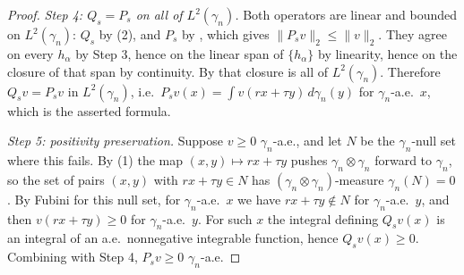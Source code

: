 \begin{proof}
\emph{Step 4: $Q_s = P_s$ on all of $L^2(\gamma_n)$.}
Both operators are linear and bounded on $L^2(\gamma_n)$: $Q_s$ by (2), and
$P_s$ by , which gives
$\|P_s v\|_2 \leq \|v\|_2$.  They agree on every $h_\alpha$ by Step 3, hence on
the linear span of $\{h_\alpha\}$ by linearity, hence on the closure of that span
by continuity.  By  that closure is all of
$L^2(\gamma_n)$.  Therefore $Q_s v = P_s v$ in $L^2(\gamma_n)$, i.e.\
$P_s v(x) = \int v(rx+\tau y)\, d\gamma_n(y)$ for $\gamma_n$-a.e.\ $x$, which is
the asserted formula.

\emph{Step 5: positivity preservation.}
Suppose $v \geq 0$ $\gamma_n$-a.e., and let $N$ be the $\gamma_n$-null set where
this fails.  By (1) the map $(x,y) \mapsto rx+\tau y$ pushes
$\gamma_n\otimes\gamma_n$ forward to $\gamma_n$, so the set of pairs $(x,y)$ with
$rx+\tau y \in N$ has $(\gamma_n\otimes\gamma_n)$-measure $\gamma_n(N) = 0$.  By
Fubini for this null set, for $\gamma_n$-a.e.\ $x$ we have $rx+\tau y \notin N$
for $\gamma_n$-a.e.\ $y$, and then $v(rx+\tau y) \geq 0$ for $\gamma_n$-a.e.\ $y$.
For such $x$ the integral defining $Q_sv(x)$ is an integral of an a.e.\
nonnegative integrable function, hence $Q_s v(x) \geq 0$.  Combining with Step 4,
$P_s v \geq 0$ $\gamma_n$-a.e.
\end{proof}
